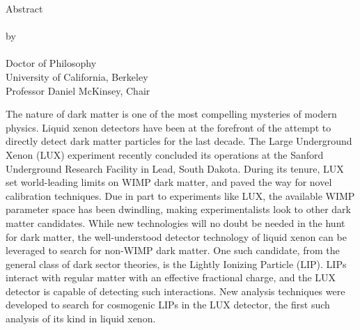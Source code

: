 


\begingroup
\let\clearpage\relax
\let\cleardoublepage\relax
\let\cleardoublepage\relax


\begin{center}
Abstract  \\ \bigskip
\myTitle \\ \bigskip
by \\ \bigskip
\myName \\ \bigskip
Doctor of Philosophy \\ \smallskip
University of California, Berkeley \\ \smallskip
Professor Daniel McKinsey, Chair \\
\end{center}

\vspace{2cm}

\noindent The nature of dark matter is one of the most compelling mysteries of modern physics. Liquid xenon detectors have been at the forefront of the attempt to directly detect dark matter particles for the last decade. The Large Underground Xenon (LUX) experiment recently concluded its operations at the Sanford Underground Research Facility in Lead, South Dakota. During its tenure, LUX set world-leading limits on WIMP dark matter, and paved the way for novel calibration techniques. Due in part to experiments like LUX, the available WIMP parameter space has been dwindling, making experimentalists look to other dark matter candidates. While new technologies will no doubt be needed in the hunt for dark matter, the well-understood detector technology of liquid xenon can be leveraged to search for non-WIMP dark matter. One such candidate, from the general class of dark sector theories, is the Lightly Ionizing Particle (LIP). LIPs interact with regular matter with an effective fractional charge, and the LUX detector is capable of detecting such interactions. New analysis techniques were developed to search for cosmogenic LIPs in the LUX detector, the first such analysis of its kind in liquid xenon.  \\ \smallskip

